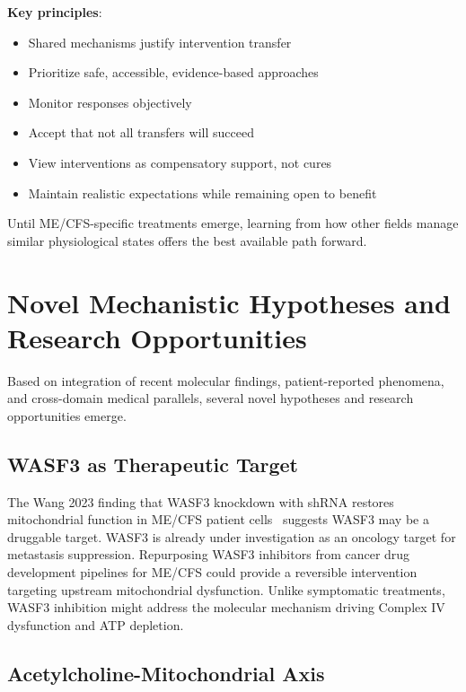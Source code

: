\textbf{Key principles}:
\begin{itemize}
    \item Shared mechanisms justify intervention transfer
    \item Prioritize safe, accessible, evidence-based approaches
    \item Monitor responses objectively
    \item Accept that not all transfers will succeed
    \item View interventions as compensatory support, not cures
    \item Maintain realistic expectations while remaining open to benefit
\end{itemize}

Until ME/CFS-specific treatments emerge, learning from how other fields manage similar physiological states offers the best available path forward.

\section{Novel Mechanistic Hypotheses and Research Opportunities}
\label{sec:novel-hypotheses}

Based on integration of recent molecular findings, patient-reported phenomena, and cross-domain medical parallels, several novel hypotheses and research opportunities emerge.

\subsection{WASF3 as Therapeutic Target}
\label{subsec:wasf3-drug-target}

\begin{speculation}
\label{spec:wasf3-inhibitor}
The Wang 2023 finding that WASF3 knockdown with shRNA restores mitochondrial function in ME/CFS patient cells~\cite{wang2023wasf3} suggests WASF3 may be a druggable target. WASF3 is already under investigation as an oncology target for metastasis suppression. Repurposing WASF3 inhibitors from cancer drug development pipelines for ME/CFS could provide a reversible intervention targeting upstream mitochondrial dysfunction. Unlike symptomatic treatments, WASF3 inhibition might address the molecular mechanism driving Complex IV dysfunction and ATP depletion.
\end{speculation}

\subsection{Acetylcholine-Mitochondrial Axis}
\label{subsec:acetylcholine-mito}

